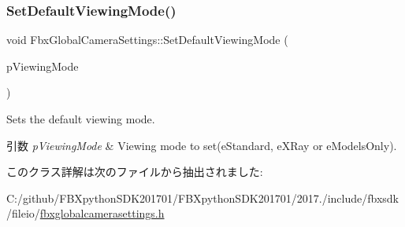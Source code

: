 \subsubsection{\texorpdfstring{Set\+Default\+Viewing\+Mode()}{SetDefaultViewingMode()}}
{\footnotesize\ttfamily void Fbx\+Global\+Camera\+Settings\+::\+Set\+Default\+Viewing\+Mode (\begin{DoxyParamCaption}\item[{\hyperlink{class_fbx_global_camera_settings_aaa674f8b39e4cd57d7cc07f381f11858}{E\+Viewing\+Mode}}]{p\+Viewing\+Mode }\end{DoxyParamCaption})}

Sets the default viewing mode. 
\begin{DoxyParams}{引数}
{\em p\+Viewing\+Mode} & Viewing mode to set(e\+Standard, e\+X\+Ray or e\+Models\+Only). \\
\hline
\end{DoxyParams}


このクラス詳解は次のファイルから抽出されました\+:\begin{DoxyCompactItemize}
\item 
C\+:/github/\+F\+B\+Xpython\+S\+D\+K201701/\+F\+B\+Xpython\+S\+D\+K201701/2017./include/fbxsdk/fileio/\hyperlink{fbxglobalcamerasettings_8h}{fbxglobalcamerasettings.\+h}\end{DoxyCompactItemize}
